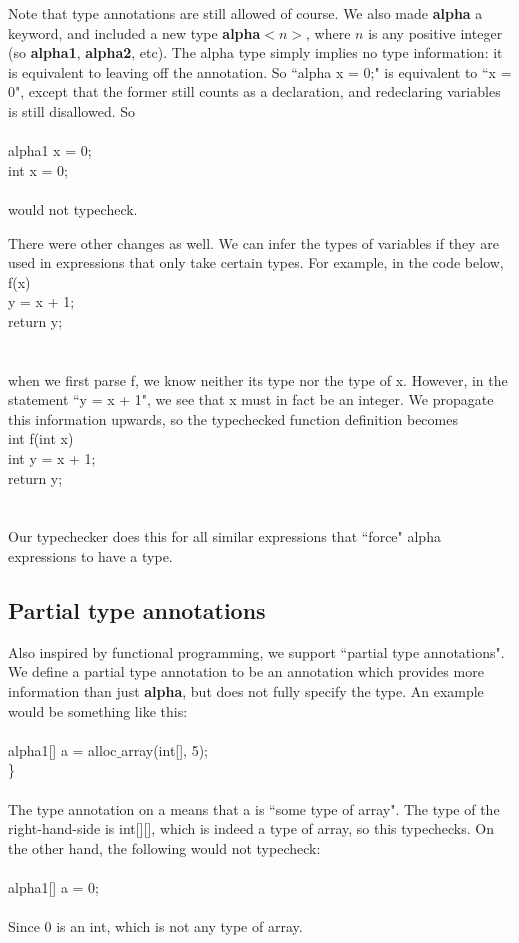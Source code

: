 \documentclass{article}
\begin{document}
Note that type annotations are still allowed of course. We also made \textbf{alpha} a keyword, and included a new type \textbf{alpha}$<n>$, where $n$ is any positive integer (so \textbf{alpha1}, \textbf{alpha2}, etc). The alpha type simply implies no type information: it is equivalent to leaving off the annotation. So ``alpha x = 0;" is equivalent to ``x = 0", except that the former still counts as a declaration, and redeclaring variables is still disallowed. So\\
\\
alpha1 x = 0;\\
int x = 0;\\
\\
would not typecheck.

There were other changes as well. We can infer the types of variables if they are used in expressions that only take certain types. For example, in the code below,
\\
f(x) { \\
  y = x + 1; \\
  return y; \\
} \\
\\
when we first parse f, we know neither its type nor the type of x. However, in the statement ``y = x + 1", we see that x must in fact be an integer. We propagate this information upwards, so the typechecked function definition becomes
\\
int f(int x) { \\
  int y = x + 1; \\
  return y; \\
} \\
\\
Our typechecker does this for all similar expressions that ``force" alpha expressions to have a type.

\subsection{Partial type annotations}
Also inspired by functional programming, we support ``partial type annotations". We define a partial type annotation to be an annotation which provides more information than just \textbf{alpha}, but does not fully specify the type. An example would be something like this:\\
\\
alpha1[] a = alloc$\_$array(int[], 5);\\
\}\\
\\
The type annotation on a means that a is ``some type of array". The type of the right-hand-side is int[][], which is indeed a type of array, so this typechecks. On the other hand, the following would not typecheck:\\
\\
alpha1[] a = 0;\\
\\
Since 0 is an int, which is not any type of array.
\end{document}
